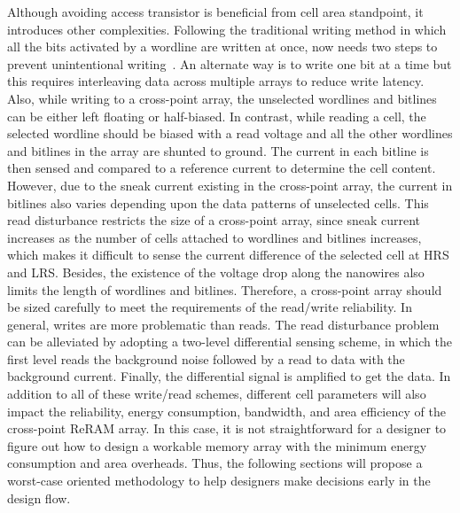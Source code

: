 Although avoiding access transistor is beneficial from cell area standpoint, it
introduces other complexities. Following the traditional writing method in which all
the bits activated by a wordline are written at once, now needs two steps
to prevent unintentional writing~\cite{memristor:Cong}. An alternate way is
to write one bit at a time but this requires interleaving data across multiple
arrays to reduce write latency.
Also, while writing to a cross-point array, the unselected wordlines
and bitlines can be either left floating or half-biased. In contrast, while reading
a cell, the selected wordline should be biased with a read
voltage and all the other wordlines and bitlines in the array are shunted
to ground. The current in each bitline is then sensed and compared to a
reference current to determine the cell content. However, due to the sneak
current existing in the cross-point array, the current in bitlines also
varies depending upon the data patterns of unselected cells.
This read disturbance restricts the size of a cross-point array, since
sneak current increases as the number of cells attached to wordlines and
bitlines increases, which makes it difficult to sense the current
difference of the selected cell at HRS and LRS. Besides, the existence of
the voltage drop along the nanowires also limits the length of wordlines
and bitlines. Therefore, a cross-point array should be sized carefully to
meet the requirements of the read/write reliability.
In general, writes are more problematic than reads.
The read disturbance problem can be alleviated by adopting a two-level differential
sensing scheme, in which the first level reads the background noise followed by
a read to data with the background current. Finally, the differential signal is
amplified to get the data.
In addition to all of these write/read schemes, different cell parameters
will also impact the reliability, energy consumption, bandwidth, and area
efficiency of the cross-point ReRAM array. In this case, it is not
straightforward for a designer to figure out how to design a workable
memory array with the minimum energy consumption and area overheads. Thus,
the following sections will propose a worst-case oriented methodology to
help designers make decisions early in the design flow.



